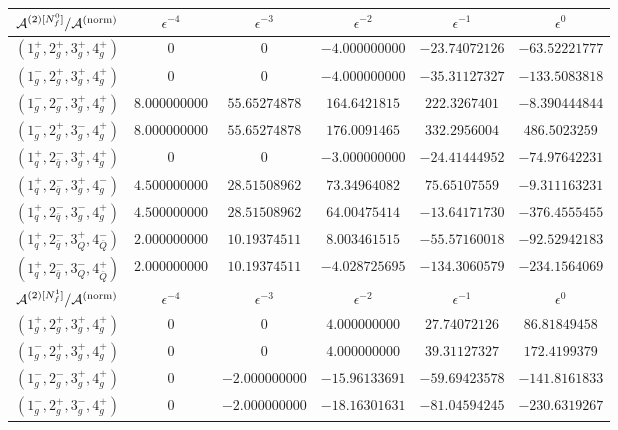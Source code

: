 \begin{table}[h]
  \begin{adjustbox}{width=1\textwidth}
    \centering
    \begin{tabular}{cccccc}
      \toprule
      $\mathcal{A}^{(2)[N_f^0]}/\mathcal{A}^\mathrm{(norm)}$	  &   $\epsilon^{-4}$   &   $\epsilon^{-3}$   &   $\epsilon^{-2}$   &   $\epsilon^{-1}$   &   $\epsilon^{0}$   \\
      \midrule
      $( 1_g^+, 2_g^+, 3_g^+, 4_g^+ )$ & 0 & 0 & $-4.000000000$ & $-23.74072126$ & $-63.52221777$ \\
      $( 1_g^-, 2_g^+, 3_g^+, 4_g^+ )$ & 0 & 0 & $-4.000000000$ & $-35.31127327$ & $-133.5083818$ \\
      $( 1_g^-, 2_g^-, 3_g^+, 4_g^+ )$ & $8.000000000$ & $55.65274878$ & $164.6421815$ & $222.3267401$ & $-8.390444844$ \\
      $( 1_g^-, 2_g^+, 3_g^-, 4_g^+ )$ & $8.000000000$ & $55.65274878$ & $176.0091465$ & $332.2956004$ & $486.5023259$ \\
      \midrule
      $( 1_q^+, 2_{\bar q}^-, 3_g^+, 4_g^+ )$ & 0 & 0 & $-3.000000000$ & $-24.41444952$ & $-74.97642231$ \\
      $( 1_q^+, 2_{\bar q}^-, 3_g^+, 4_g^- )$ & $4.500000000$ & $28.51508962$ & $73.34964082$ & $75.65107559$ & $-9.311163231$ \\
      $( 1_q^+, 2_{\bar q}^-, 3_g^-, 4_g^+ )$ & $4.500000000$ & $28.51508962$ & $64.00475414$ & $-13.64171730$ & $-376.4555455$ \\
      \midrule
      $( 1_q^+, 2_{\bar q}^-, 3_Q^+, 4_{\bar Q}^- )$ & $2.000000000$ & $10.19374511$ & $8.003461515$ & $-55.57160018$ & $-92.52942183$ \\
      $( 1_q^+, 2_{\bar q}^-, 3_Q^-, 4_{\bar Q}^+ )$ & $2.000000000$ & $10.19374511$ & $-4.028725695$ & $-134.3060579$ & $-234.1564069$ \\
      \toprule
      $\mathcal{A}^{(2)[N_f^1]}/\mathcal{A}^\mathrm{(norm)}$	  &   $\epsilon^{-4}$   &   $\epsilon^{-3}$   &   $\epsilon^{-2}$   &   $\epsilon^{-1}$   &   $\epsilon^{0}$   \\
      \midrule
      $( 1_g^+, 2_g^+, 3_g^+, 4_g^+ )$ & 0 & 0 & $4.000000000$ & $27.74072126$ & $86.81849458$ \\
      $( 1_g^-, 2_g^+, 3_g^+, 4_g^+ )$ & 0 & 0 & $4.000000000$ & $39.31127327$ & $172.4199379$ \\
      $( 1_g^-, 2_g^-, 3_g^+, 4_g^+ )$ & 0 & $-2.000000000$ & $-15.96133691$ & $-59.69423578$ & $-141.8161833$ \\
      $( 1_g^-, 2_g^+, 3_g^-, 4_g^+ )$ & 0 & $-2.000000000$ & $-18.16301631$ & $-81.04594245$ & $-230.6319267$ \\

\end{tabular}
\end{adjustbox}
\end{table}
